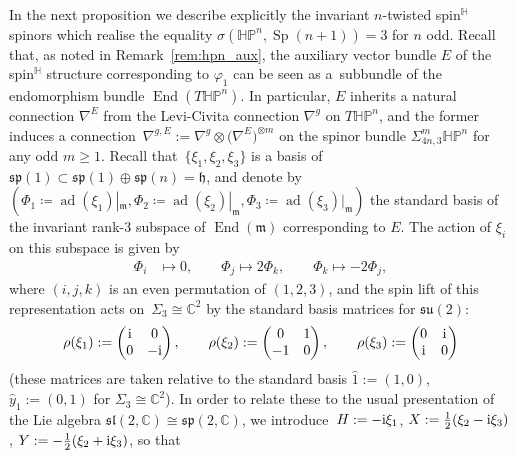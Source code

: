\documentclass[pdftex]{sigma}
\numberwithin{equation}{section}
\newcommand{\C}{\mathbb{C}} %
\newcommand{\restr}[1]{|_{#1}}
\DeclareMathOperator{\ad}{ad}
\DeclareMathOperator{\Sp}{Sp}
\DeclareMathOperator{\End}{End}
\begin{document}
		In the next proposition we describe explicitly the invariant $n$-twisted spin$^{\mathbb{H}}$ spinors which realise the equality $\sigma(\mathbb{HP}^n,\Sp(n+1))=3$ for $n$ odd. Recall that, as noted in Remark~\ref{rem:hpn_aux}, the auxiliary vector bundle $E$ of the spin$^\mathbb{H}$ structure corresponding to $\varphi_1$ can be seen as a~subbundle of the endomorphism bundle $\End(T \mathbb{HP}^n)$. In particular, $E$ inherits a natural connection $\nabla^E$ from the Levi-Civita connection $\nabla^{g}$ on $T \mathbb{HP}^n$, and the former induces a connection~${\nabla^{g,E}:=\nabla^g\otimes\bigl(\nabla^E\bigr)^{\otimes m}}$ on the spinor bundle $\Sigma_{4n,3}^m \mathbb{HP}^n$ for any odd $m \geq 1$. Recall that~${\{\xi_1,\xi_2,\xi_3\}}$ is a basis of $\mathfrak{sp}(1) \subset \mathfrak{sp}(1) \oplus \mathfrak{sp}(n) = \mathfrak{h}$, and denote by $ ( \Phi_1 \coloneqq \ad(\xi_1) \restr{\mathfrak{m}} , \allowbreak \Phi_2 \coloneqq \ad(\xi_2) \restr{\mathfrak{m}} , \Phi_3 \coloneqq \ad(\xi_3) \restr{\mathfrak{m}} )$ the standard basis of the invariant rank-$3$ subspace of $\End(\mathfrak{m})$ corresponding to $E$. The action of $\xi_i$ on this subspace is given by
		\begin{align*}
			\Phi_i&\mapsto 0, \qquad \Phi_j\mapsto 2\Phi_k, \qquad \Phi_k\mapsto -2\Phi_j ,
		\end{align*}
		where $(i,j,k)$ is an even permutation of $(1,2,3)$,
		and the spin lift of this representation acts on~${\Sigma_3\cong \C^2}$ by the standard basis matrices for $\mathfrak{su}(2)$:
		\begin{align*}
			\rho(\xi_1):= \begin{pmatrix}
				{\rm i} & 0\\ 0 & -{\rm i}
			\end{pmatrix} , \qquad \rho(\xi_2):= \begin{pmatrix}
				0 & 1\\ -1 & 0
			\end{pmatrix}, \qquad
			\rho(\xi_3):= \begin{pmatrix}
				0 & {\rm i} \\ {\rm i} & 0
			\end{pmatrix}
		\end{align*}
		(these matrices are taken relative to the standard basis $\hat{1}:=(1,0)$, $\hat{y}_1:= (0,1)$ for $\Sigma_3\cong \C^2 $). In order to relate these to the usual presentation of the Lie algebra $\mathfrak{sl}(2,\C)\cong \mathfrak{sp}(2,\C)$, we introduce~${H:=-{\rm i}\xi_1}$, $X:=\frac{1}{2}(\xi_2-{\rm i} \xi_3)$, $Y:= - \frac{1}{2}(\xi_2+{\rm i}\xi_3) $, so that
\end{document}
